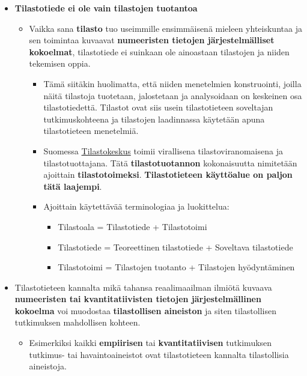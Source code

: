 \documentclass[
]{book}
\providecommand{\tightlist}{%
  \setlength{\itemsep}{0pt}\setlength{\parskip}{0pt}}
\begin{document}
\begin{itemize}
\tightlist
\item
  \textbf{Tilastotiede ei ole vain tilastojen tuotantoa}

  \begin{itemize}
  \tightlist
  \item
    Vaikka sana \textbf{tilasto} tuo useimmille ensimmäisenä mieleen yhteiskuntaa ja sen toimintaa kuvaavat \textbf{numeeristen tietojen järjestelmälliset kokoelmat}, tilastotiede ei suinkaan ole ainoastaan tilastojen ja niiden tekemisen oppia.

    \begin{itemize}
    \tightlist
    \item
      Tämä siitäkin huolimatta, että niiden menetelmien konstruointi, joilla näitä tilastoja tuotetaan, jalostetaan ja analysoidaan on keskeinen osa tilastotiedettä. Tilastot ovat siis usein tilastotieteen soveltajan tutkimuskohteena ja tilastojen laadinnassa käytetään apuna tilastotieteen menetelmiä.
    \item
      Suomessa \href{https://www.stat.fi/}{Tilastokeskus} toimii virallisena tilastoviranomaisena ja tilastotuottajana. Tätä \textbf{tilastotuotannon} kokonaisuutta nimitetään ajoittain \textbf{tilastotoimeksi}. \textbf{Tilastotieteen käyttöalue on paljon tätä laajempi}.
    \item
      Ajoittain käytettävää terminologiaa ja luokittelua:

      \begin{itemize}
      \tightlist
      \item
        Tilastoala = Tilastotiede + Tilastotoimi
      \item
        Tilastotiede = Teoreettinen tilastotiede + Soveltava tilastotiede
      \item
        Tilastotoimi = Tilastojen tuotanto + Tilastojen hyödyntäminen
      \end{itemize}
    \end{itemize}
  \end{itemize}
\item
  Tilastotieteen kannalta mikä tahansa reaalimaailman ilmiötä kuvaava \textbf{numeeristen tai kvantitatiivisten tietojen järjestelmällinen kokoelma} voi muodostaa \textbf{tilastollisen aineiston} ja siten tilastollisen tutkimuksen mahdollisen kohteen.

  \begin{itemize}
  \tightlist
  \item
    Esimerkiksi kaikki \textbf{empiirisen} tai \textbf{kvantitatiivisen} tutkimuksen tutkimus- tai havaintoaineistot ovat tilastotieteen kannalta tilastollisia aineistoja.
  \end{itemize}
\end{itemize}
\end{document}
